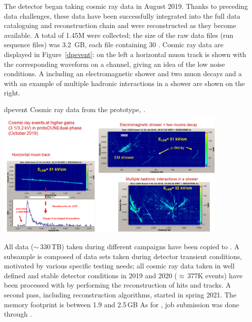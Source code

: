 \documentclass[../main-v1.tex]{subfiles}
\begin{document}
The  detector began taking cosmic ray data in August 2019. Thanks to preceding data challenges, these data have been successfully integrated into the full data cataloguing and reconstruction chain and were   reconstructed as they become available.
A total of 1.45M  were collected; the size of the raw data files (run sequence files) was 3.2 \,GB, each file containing 30 . Cosmic ray data are displayed in Figure~\ref{dpevent}: on
the left a horizontal muon track is shown with the corresponding waveform on a channel, giving an
idea of the low noise conditions. A  including an electromagnetic shower and two muon decays
and a  with an example of multiple hadronic interactions in a shower are shown on the right.


 
\begin{dunefigure}
{dpevent} %
{Cosmic ray data from the  prototype, .}
\includegraphics[width=0.85\textwidth]{graphics/IntroFigures/Fig_09_protodune-dp-event.png}
\end{dunefigure}


All data ($\sim$\,330\,TB) taken during different campaigns   have been copied to . A subsample is composed of data sets taken during detector transient conditions, motivated by various specific testing needs;  all cosmic ray data taken in well defined and stable detector conditions in 2019 and 2020 ($\approx$\,377K events) have been processed with  by performing the reconstruction of hits and \twod tracks. A second pass, including  reconstruction algorithms, started in spring 2021. 
The memory footprint is between 1.9 and 2.5\,GB
As for , job submission was done through .
\end{document}
